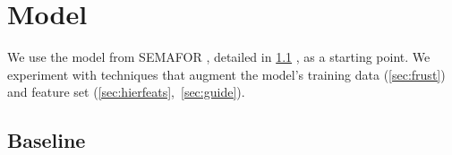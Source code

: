 \documentclass[11pt,a4paper]{article}
\newcommand{\finalversion}[1]{}
\begin{document}
\finalversion{
PropBank provides one million words of fully annotated English sentences.
Very little data is annotated with both PropBank and FrameNet analyses.
Therefore, to bridge between the PropBank and FrameNet corpora, 
we run a PropBank-trained semantic role labeler 
on the FrameNet data as an additional form of preprocessing.\footnote{In preliminary experiments, 
we tried to leverage PropBank annotations in SemLink \citep{bonial-13}, which include mappings to FrameNet.
We found that FrameNet mappings in SemLink are noisy/incomplete; including 
SemLink sentences in the training data only hurt performance.}
}

\section{Model}

We use the model from SEMAFOR \citep{das-14}, detailed in
\cref{sec:base_model}%
, as a starting point.
We experiment with %
techniques that augment
the model's training data (\cref{sec:frust}) and feature set %
(\cref{sec:hierfeats},~\cref{sec:guide}).

\subsection{Baseline}
\label{sec:base_model}
\end{document}
